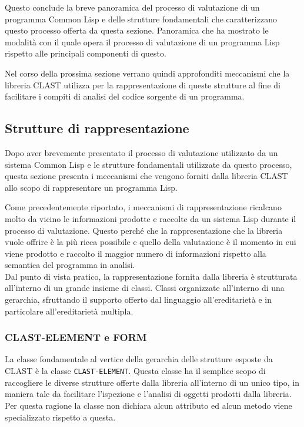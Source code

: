 Questo conclude la breve panoramica del processo di valutazione di un
programma Common Lisp e delle strutture fondamentali che caratterizzano questo
processo offerta da questa sezione. Panoramica che ha mostrato le modalità con
il quale opera il processo di valutazione di un programma Lisp rispetto alle
principali componenti di questo.

Nel corso della prossima sezione verrano quindi approfonditi meccanismi che la
libreria CLAST utilizza per la rappresentazione di queste strutture al fine di
facilitare i compiti di analisi del codice sorgente di un programma.

\subsection{Strutture di rappresentazione}

Dopo aver brevemente presentato il processo di valutazione utilizzato da un
sistema Common Lisp e le strutture fondamentali utilizzate da questo processo,
questa sezione presenta i meccanismi che vengono forniti dalla libreria CLAST
allo scopo di rappresentare un programma Lisp.

Come precedentemente riportato, i meccanismi di rappresentazione ricalcano
molto da vicino le informazioni prodotte e raccolte da un sistema Lisp durante
il processo di valutazione. Questo perché che la rappresentazione che la
libreria vuole offrire è la più ricca possibile e quello della valutazione è
il momento in cui viene prodotto e raccolto il maggior numero di informazioni
rispetto alla semantica del programma in analisi.\\

Dal punto di vista pratico, la rappresentazione fornita dalla libreria è
strutturata all’interno di un grande insieme di classi. Classi organizzate
all’interno di una gerarchia, sfruttando il supporto offerto dal linguaggio
all’ereditarietà e in particolare all’ereditarietà multipla.

\subsubsection{CLAST-ELEMENT e FORM}

La classe fondamentale al vertice della gerarchia delle strutture esposte da
CLAST è la classe \texttt{CLAST-ELEMENT}. Questa classe ha il semplice scopo
di raccogliere le diverse strutture offerte dalla libreria all'interno di un
unico tipo, in maniera tale da facilitare l’ispezione e l’analisi di oggetti
prodotti dalla libreria. Per questa ragione la classe non dichiara alcun
attributo ed alcun metodo viene specializzato rispetto a questa.\\

